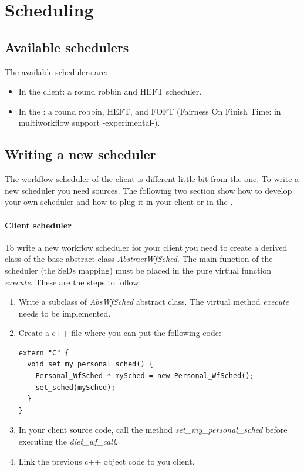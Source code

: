 \section{Scheduling}
\label{sec:wf_sched}

\subsection{Available schedulers}

The available schedulers are:

\begin{itemize}
\item In the client: a round robbin and HEFT scheduler.
\item In the \madag: a round robbin, HEFT, and FOFT (Fairness On
  Finish Time: in multiworkflow support -experimental-).
\end{itemize}

\subsection{Writing a new scheduler}

The workflow scheduler of the client is different little bit from the
\madag one. To write a new scheduler you need \diet sources. The
following two section show how to develop your own scheduler and how
to plug it in your client or in the \madag.

\paragraph{Client scheduler}

To write a new workflow scheduler for your \diet client you need to
create a derived class of the base abstract class
\textit{AbstractWfSched}. The main function of the scheduler (the SeDs
mapping) must be placed in the pure virtual function \textit{execute}.
These are the steps to follow:

\begin{enumerate}
\item Write a subclass of \textit{AbsWfSched} abstract class. The
  virtual method \textit{execute} needs to be implemented.
\item Create a c++ file where you can put the following code:
\begin{verbatim}
extern "C" {
  void set_my_personal_sched() {
    Personal_WfSched * mySched = new Personal_WfSched();
    set_sched(mySched);
  }
}
\end{verbatim}
\item In your client source code, call the method
  \textit{set\_my\_personal\_sched} before executing the
  \textit{diet\_wf\_call}.
\item Link the previous c++ object code to you \diet client.
\end{enumerate}

